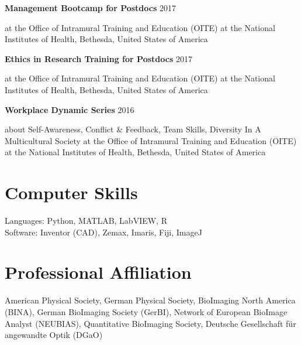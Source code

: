 \documentclass[margin,line]{res}
\begin{document}
\begin{resume}
\vspace*{-2mm}

{\bf Management Bootcamp for Postdocs} \hfill {2017}\\
\vspace*{-3.5mm}
\begin{addmargin}[0pt]{.1\linewidth}
\vspace*{-1mm}
at the Office of Intramural Training and Education (OITE) at the National Institutes of Health, Bethesda, United States of America
\end{addmargin}

\vspace*{-2mm}

{\bf Ethics in Research Training for Postdocs} \hfill {2017}\\
\vspace*{-3.5mm}
\begin{addmargin}[0pt]{.1\linewidth}
\vspace*{-1mm}
at the Office of Intramural Training and Education (OITE) at the National Institutes of Health, Bethesda, United States of America
\end{addmargin}

\vspace*{-2mm}

{\bf Workplace Dynamic Series} \hfill {2016}\\
\vspace*{-3.5mm}
\begin{addmargin}[0pt]{.1\linewidth}
\vspace*{-1mm}
about Self-Awareness, Conflict \& Feedback, Team Skills, Diversity In A Multicultural Society at the Office of Intramural Training and Education (OITE) at the National Institutes of Health, Bethesda, United States of America
\end{addmargin}


\section{\sc Computer Skills} 

Languages:  Python, MATLAB, LabVIEW, R\\ %
Software: Inventor (CAD), Zemax, Imaris, Fiji, ImageJ


\section{\sc Professional Affiliation} 
American Physical Society, German Physical Society, BioImaging North America (BINA), German BioImaging Society (GerBI), Network of European BioImage Analyst (NEUBIAS), Quantitative BioImaging Society, Deutsche Gesellschaft für angewandte Optik (DGaO)


\end{resume}
\end{document}
